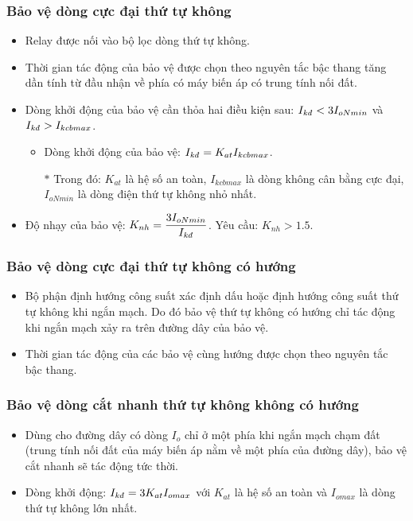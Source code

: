 \documentclass[12pt,a4paper]{article}
\begin{document}
\subsubsection{Bảo vệ dòng cực đại thứ tự không}
	\begin{itemize}
		\item Relay được nối vào bộ lọc dòng thứ tự không.
		\item Thời gian tác động của bảo vệ được chọn theo nguyên tắc bậc thang tăng dần tính từ đầu nhận về phía có máy biến áp có trung tính nối đất.
		
		\item Dòng khởi động của bảo vệ cần thỏa hai điều kiện sau: $I_{\text{\textit{kđ}}} < 3I_{oNmin}$ và $I_{\text{\textit{kđ}}} > I_{kcbmax}$.
			\begin{itemize}
				\item Dòng khởi động của bảo vệ: $I_{\text{\textit{kđ}}} = K_{at} I_{kcbmax}$.
								
				
				\item[$\ast$] Trong đó: $K_{at}$ là hệ số an toàn, $I_{kcbmax}$ là dòng không cân bằng cực đại, $I_{oNmin}$ là dòng điện thứ tự không nhỏ nhất.					
			\end{itemize} 
		\item Độ nhạy của bảo vệ: $K_{nh} = \dfrac{3 I_{oNmin}}{I_{\text{\textit{kđ}}}}$. Yêu cầu: $K_{nh} > 1.5$.
	\end{itemize}
\subsubsection{Bảo vệ dòng cực đại thứ tự không có hướng}
	\begin{itemize}
		\item Bộ phận định hướng công suất xác định dấu hoặc định hướng công suất thứ tự không khi ngắn mạch. Do đó bảo vệ thứ tự không có hướng chỉ tác động khi ngắn mạch xảy ra trên đường dây của bảo vệ.
		
		\item Thời gian tác động của các bảo vệ cùng hướng được chọn theo nguyên tắc bậc thang.		
	\end{itemize}
\subsubsection{Bảo vệ dòng cắt nhanh thứ tự không không có hướng}
	\begin{itemize}
		\item Dùng cho đường dây có dòng $I_o$ chỉ ở một phía khi ngắn mạch chạm đất (trung tính nối đất của máy biến áp nằm về một phía của đường dây), bảo vệ cắt nhanh sẽ tác động tức thời.
		
		\item Dòng khởi động: $I_{\text{\textit{kđ}}} = 3K_{at} I_{omax}$ với $K_{at}$ là hệ số an toàn và $I_{omax}$ là dòng thứ tự không lớn nhất.
	\end{itemize}
\end{document}
